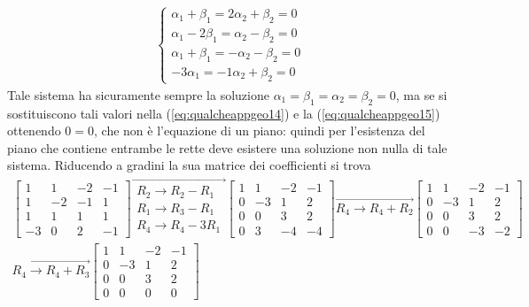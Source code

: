 \begin{es}
\begin{eqnarray*}
    \begin{cases}
      \alpha_1+\beta_1=2\alpha_2+\beta_2=0\\
      \alpha_1-2\beta_1=\alpha_2-\beta_2=0\\
      \alpha_1+\beta_1=-\alpha_2-\beta_2=0\\
      -3\alpha_1=-1\alpha_2+\beta_2=0
    \end{cases}
  \end{eqnarray*}
  Tale sistema ha sicuramente sempre la soluzione $\alpha_1=\beta_1
  =\alpha_2=\beta_2=0$, ma se si sostituiscono tali valori nella
  (\ref{eq:qualcheappgeo14}) e la (\ref{eq:qualcheappgeo15}) ottenendo
  $0=0$, che non è l'equazione di un piano: quindi per l'esistenza del
  piano che contiene entrambe le rette deve esistere una soluzione non
  nulla di tale sistema. Riducendo a gradini la sua matrice dei
  coefficienti si trova
  \begin{eqnarray*}
    \begin{bmatrix}
      1 & 1 & -2 & -1\\
      1 & -2 & -1 & 1\\
      1 & 1 & 1 & 1\\
      -3 & 0 & 2 & -1
    \end{bmatrix}\overrightarrow{
    \begin{matrix}
      R_2\to R_2-R_1\\
      R_1\to R_3-R_1\\
      R_4\to R_4-3R_1
    \end{matrix}
    }
    \begin{bmatrix}
      1 & 1 & -2 & -1\\
      0 & -3 & 1 & 2\\
      0 & 0 & 3 & 2\\
      0 & 3 & -4 & -4
    \end{bmatrix}
    \overrightarrow{R_4\to R_4+R_2}
    \begin{bmatrix}
      1 & 1 & -2 & -1\\
      0 & -3 & 1 & 2\\
      0 & 0 & 3 & 2\\
      0 & 0 & -3 & -2
    \end{bmatrix}\\\overrightarrow{R_4\to R_4+R_3}
    \begin{bmatrix}
      1 & 1 & -2 & -1\\
      0 & -3 & 1 & 2 \\
      0 & 0 & 3 & 2\\
      0 & 0 & 0 & 0

\end{bmatrix}
\end{eqnarray*}
\end{es}
